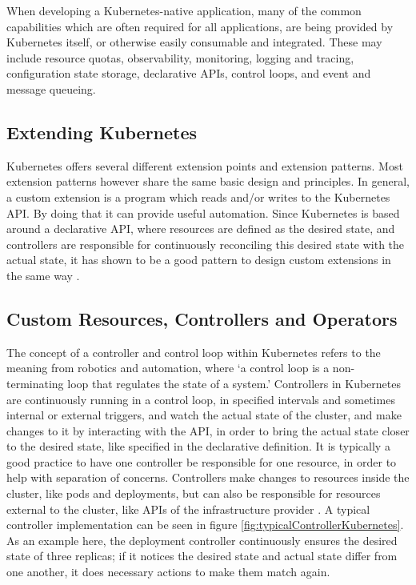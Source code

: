 When developing a Kubernetes-native application,
many of the common capabilities which are often required for all applications,
are being provided by Kubernetes itself, or otherwise easily consumable and integrated.
These may include resource quotas, observability, monitoring, logging and tracing,
configuration state storage, declarative APIs, control loops, and event and message queueing.

\subsection*{Extending Kubernetes}
Kubernetes offers several different extension points and extension patterns.
Most extension patterns however share the same basic design and principles.
In general, a custom extension is a program which reads and/or writes
to the Kubernetes API. By doing that it can provide useful automation.
Since Kubernetes is based around a declarative API,
where resources are defined as the desired state,
and controllers are responsible for continuously reconciling this
desired state with the actual state,
it has shown to be a good pattern to design custom extensions in the same way
\autocite{extendKubernetes}.

\subsection*{Custom Resources, Controllers and Operators}
The concept of a controller and control loop within Kubernetes refers to the
meaning from robotics and automation, where
\enquote*{a control loop is a non-terminating loop that regulates the state of a system.}
\autocite{controllersKubernetes}
Controllers in Kubernetes are continuously running in a control loop,
in specified intervals and sometimes internal or external triggers, 
and watch the actual state of the cluster,
and make changes to it by interacting with the API,
in order to bring the actual state closer to the desired state,
like specified in the declarative definition.
It is typically a good practice to have one controller
be responsible for one resource, 
in order to help with separation of concerns.
Controllers make changes to resources inside the cluster,
like pods and deployments,
but can also be responsible for resources external to the cluster,
like APIs of the infrastructure provider
\autocite{controllersKubernetes}.
A typical controller implementation can be seen in figure
\ref{fig:typicalControllerKubernetes}.
As an example here, the deployment controller continuously ensures the desired state
of three replicas; if it notices the desired state and actual state differ
from one another, it does necessary actions to make them match again.

